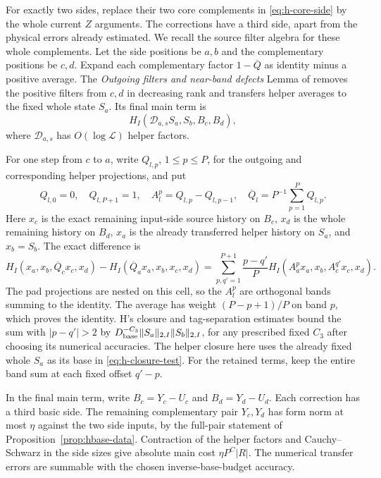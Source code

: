 For exactly two sides, replace their two core complements in
\eqref{eq:h-core-side} by the whole current \(Z\) arguments.
The corrections have a third side, apart from the physical errors
already estimated.  We recall the source filter algebra for these
whole complements.  Let the side positions be \(a,b\) and the
complementary positions be \(c,d\).  Expand each complementary
factor \(1-\overline Q\) as identity minus a positive average.
The \emph{Outgoing filters and near-band defects} Lemma of
\cite[Section~6]{H} removes the positive filters from \(c,d\)
in decreasing rank and transfers helper averages to the fixed
whole state \(S_a\).  Its final main term is
\[
 H_I(\mathcal D_{a,s}S_a,S_b,B_c,B_d),
\]
where \(\mathcal D_{a,s}\) has \(O(\log\mathcal L)\) helper
factors.

For one step from \(c\) to \(a\), write \(Q_{l,p}\),
\(1\le p\le P\), for the outgoing and corresponding helper
projections, and put
\[
 Q_{l,0}=0,\quad Q_{l,P+1}=1,\quad
 A_l^p=Q_{l,p}-Q_{l,p-1},\quad
 \overline Q_l=P^{-1}\sum_{p=1}^P Q_{l,p}.
\]
Here \(x_c\) is the exact remaining input-side source history
on \(B_c\), \(x_d\) is the whole remaining history on \(B_d\),
\(x_a\) is the already transferred helper history on \(S_a\),
and \(x_b=S_b\).  The exact difference is
\begin{equation}
 H_I(x_a,x_b,\overline Q_cx_c,x_d)
       -H_I(\overline Q_ax_a,x_b,x_c,x_d)
 =\sum_{p,q'=1}^{P+1}\frac{p-q'}P
       H_I(A_a^p x_a,x_b,A_c^{q'}x_c,x_d).
 \label{eq:h-transfer}
\end{equation}
The pad projections are nested on this cell, so the \(A_l^p\)
are orthogonal bands summing to the identity.  The average has
weight \((P-p+1)/P\) on band \(p\), which proves the identity.
H's closure and tag-separation estimates bound the sum with
\(|p-q'|>2\) by
\(D_{\rm base}^{-C_3}\|S_a\|_{2,I}\|S_b\|_{2,I}\), for any
prescribed fixed \(C_3\) after choosing its numerical accuracies.
The helper closure here uses the already fixed whole \(S_a\)
as its base in \eqref{eq:h-closure-test}.  For the retained terms,
keep the entire band sum at each fixed offset \(q'-p\).

In the final main term, write \(B_c=Y_c-U_c\) and
\(B_d=Y_d-U_d\).  Each correction has a third basic side.
The remaining complementary pair \(Y_c,Y_d\) has form norm at
most \(\eta\) against the two side inputs, by the full-pair
statement of Proposition~\ref{prop:hbase-data}.  Contraction of
the helper factors and Cauchy--Schwarz in the side sizes give
absolute main cost \(\eta P^C|R|\).  The numerical transfer
errors are summable with the chosen inverse-base-budget accuracy.

